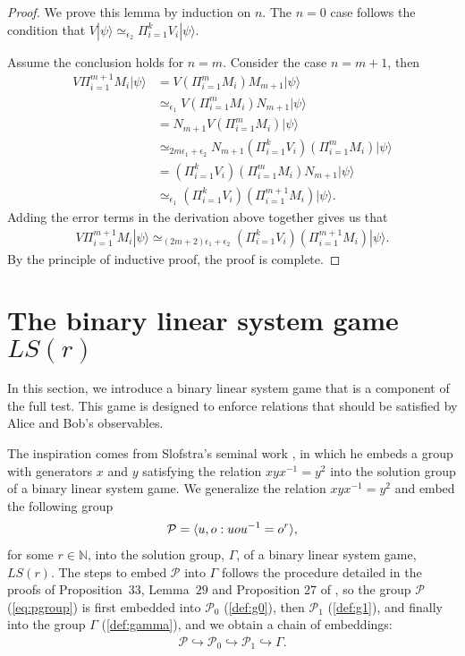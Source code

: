 \documentclass[11pt,letterpaper]{article}
\newcommand{\ket}[1]{|#1\rangle}
\DeclarePairedDelimiter{\ip}{\langle}{\rangle}
\newcommand{\N}{\mathbb{N}}
\newcommand{\1}{\mathbb{1}}
\newcommand{\Pg}{\mathcal{P}}
\newcommand{\LS}{LS}
\newcommand{\ep}{\epsilon}
\newcommand{\appd}[1]{\simeq_{#1}}
\theoremstyle{definition}
\begin{document}
\begin{proof}
    We prove this lemma by induction on $n$.
    The $n = 0$ case follows the condition that $V \ket{\psi} \appd{\ep_2} \Pi_{i=1}^k V_i \ket{\psi}$.
    
    Assume the conclusion holds for $n = m$.
    Consider the case $n = m+1$, then
    \begin{align*}
        V\Pi_{i=1}^{m+1} M_i \ket{\psi} 
        &= V \left(\Pi_{i=1}^{m} M_i\right) M_{m+1} \ket{\psi} \\
        &\appd{\ep_1} V \left(\Pi_{i=1}^{m} M_i\right) N_{m+1} \ket{\psi} \\
        &= N_{m+1} V \left(\Pi_{i=1}^{m} M_i\right) \ket{\psi} \\
        &\appd{2m\ep_1+\ep_2} N_{m+1}\left(\Pi_{i=1}^k V_i\right) 
        \left(\Pi_{i=1}^m M_i \right)\ket{\psi} \\
        &=\left(\Pi_{i=1}^k V_i\right) 
        \left(\Pi_{i=1}^m M_i \right) N_{m+1} \ket{\psi} \\
        &\appd{\ep_1} \left(\Pi_{i=1}^k V_i\right) 
        \left(\Pi_{i=1}^{m+1} M_i \right) \ket{\psi}.
    \end{align*}
    Adding the error terms in the derivation above together gives us that
    \begin{align*}
        V\Pi_{i=1}^{m+1} M_i \ket{\psi} 
        \appd{(2m+2)\ep_1+\ep_2} \left(\Pi_{i=1}^k V_i\right) 
        \left(\Pi_{i=1}^{m+1} M_i \right) \ket{\psi}.
    \end{align*}
    By the principle of inductive proof, the proof is complete.
\end{proof}
\section{The binary linear system game $\LS(r)$}
\label{sec:lsg}
In this section, we introduce a binary linear system game that is a component of the full test.
This game is designed to enforce relations that should be satisfied by 
Alice and Bob's observables. 

The inspiration comes from 
Slofstra's seminal work \cite{slofstra2017}, in which he
embeds a group with generators $x$ and $y$ satisfying the relation $xyx^{-1}=y^2$
into the solution group of a binary linear system game.  
We generalize the relation $xyx^{-1} = y^2$ and embed the 
following group
\begin{align}
    \Pg = \ip{u,o:uou^{-1} = o^r},
\label{eq:pgroup}
\end{align}
for some $r \in \N$, into the solution group, $\Gamma$, of a binary linear system game, $\LS(r)$.
The steps to embed $\Pg$ into $\Gamma$ follows the procedure detailed 
in the proofs of Proposition~$33$, Lemma~$29$ and Proposition $27$ of \cite{slofstra2017}, 
so the group $\Pg$ (\cref{eq:pgroup}) is first embedded into $\Pg_0$ (\cref{def:g0}), then $\Pg_1$ (\cref{def:g1}), and finally into the group $\Gamma$ (\cref{def:gamma}),
and we obtain a chain of embeddings:
\begin{align}
\Pg \hookrightarrow \Pg_0 \hookrightarrow \Pg_1 \hookrightarrow \Gamma.
\end{align}
\end{document}
